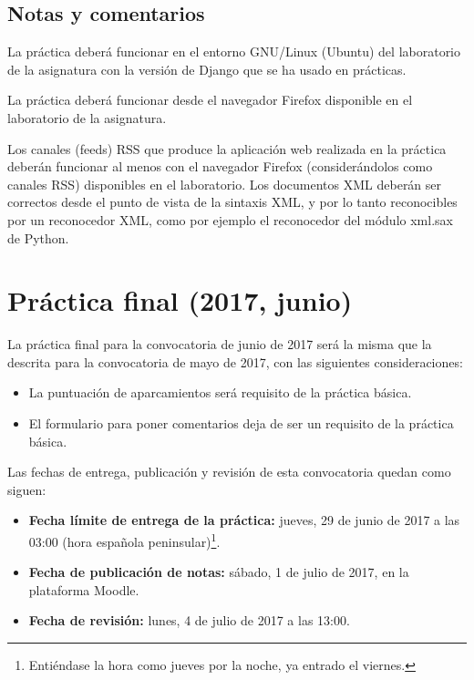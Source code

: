 \subsection{Notas y comentarios}

La práctica deberá funcionar en el entorno GNU/Linux (Ubuntu) del laboratorio de la asignatura con la versión de Django que se ha usado en prácticas.

La práctica deberá funcionar desde el navegador Firefox disponible en el laboratorio de la asignatura.

Los canales (feeds) RSS que produce la aplicación web realizada en la práctica deberán funcionar al menos con el navegador Firefox (considerándolos como canales RSS) disponibles en el laboratorio. Los documentos XML deberán ser correctos desde el punto de vista de la sintaxis XML, y por lo tanto reconocibles por un reconocedor XML, como por ejemplo el reconocedor del módulo xml.sax de Python.


\section{Práctica final (2017, junio)}
\label{practica-final-2017-06}

La práctica final para la convocatoria de junio de 2017 será la misma que la descrita para la convocatoria de mayo de 2017, con las siguientes consideraciones:

\begin{itemize}
  \item La puntuación de aparcamientos será requisito de la práctica básica.
  \item El formulario para poner comentarios deja de ser un requisito de la práctica básica.
\end{itemize}

Las fechas de entrega, publicación y revisión de esta convocatoria quedan como siguen:

\begin{itemize}
  \item \textbf{Fecha límite de entrega de la práctica:} jueves, 29 de junio de 2017 a las 03:00 (hora española peninsular)\footnote{Entiéndase la hora como jueves por la noche, ya entrado el viernes.}.

  \item \textbf{Fecha de publicación de notas:} sábado, 1 de julio de 2017, en la plataforma Moodle.

  \item \textbf{Fecha de revisión:} lunes, 4 de julio de 2017 a las 13:00.
\end{itemize}


